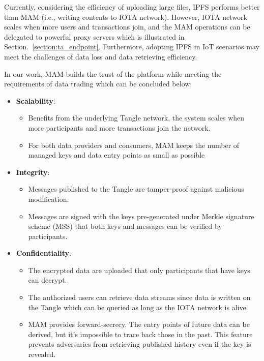 \documentclass[conference]{IEEEtran}
\begin{document}
Currently, considering the efficiency of uploading large files, IPFS performs better than MAM (i.e., writing contents to IOTA network). However, IOTA network scales when more users and transactions join, and the MAM operations can be delegated to powerful proxy servers which is illustrated in Section.~\ref{section:ta_endpoint}. Furthermore, adopting IPFS in IoT scenarios may meet the challenges of data loss and data retrieving efficiency.

In our work, MAM builds the trust of the platform while meeting the requirements of data trading which can be concluded below:

\begin{itemize}
    \item \textbf{Scalability}:
    \begin{itemize}
        \item Benefits from the underlying Tangle network, the system scales when more participants and more transactions join the network.
        \item For both data providers and consumers, MAM keeps the number of managed keys and data entry points as small as possible
    \end{itemize}    
    \item \textbf{Integrity}:
    \begin{itemize}
        \item Messages published to the Tangle are tamper-proof against malicious modification.
        \item Messages are signed with the keys pre-generated under Merkle signature scheme\cite{MSS} (MSS) that both keys and messages can be verified by participants.
    \end{itemize}
    \item \textbf{Confidentiality}:
    \begin{itemize}
        \item The encrypted data are uploaded that only participants that have keys can decrypt.
        \item The authorized users can retrieve data streams since data is written on the Tangle which can be queried as long as the IOTA network is alive.
        \item MAM provides forward-secrecy. The entry points of future data can be derived, but it's impossible to trace back those in the past. This feature prevents adversaries from retrieving published history even if the key is revealed.
    \end{itemize}
\end{itemize}
\end{document}
